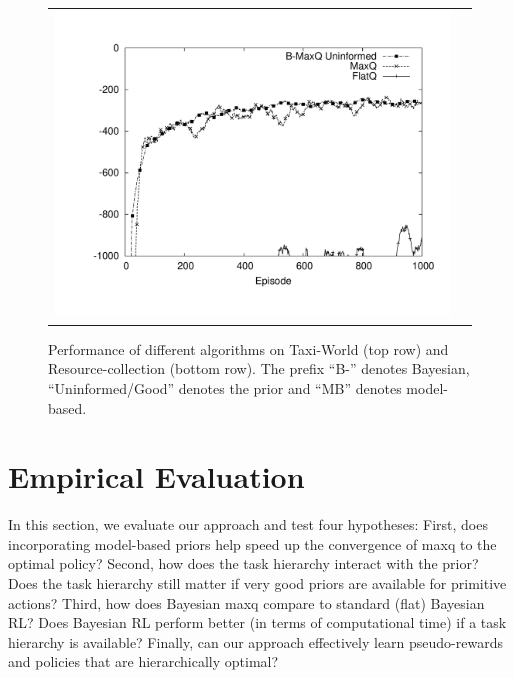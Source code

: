 \begin{figure}[ht]
\begin{tabular}{cc}
\includegraphics[trim=50 50 30 50, clip, scale=0.3]{exp/Wargus3322nb.pdf} \\
\end{tabular}

\caption{Performance of different algorithms on {\sf Taxi-World} (top row) and {\sf Resource-collection} (bottom row). The
prefix ``B-'' denotes Bayesian, ``Uninformed/Good'' denotes the
prior and ``MB'' denotes model-based.}\label{fig:nopr}
\vspace{-0.2in}
\end{figure}

\section{Empirical Evaluation}
\label{sec:expts}

In this section, we evaluate our approach and test four hypotheses:
First, does incorporating model-based priors help speed up the
convergence of {\sc maxq} to the optimal policy? Second, how does the
task hierarchy interact with the prior? Does the task hierarchy still
matter if very good priors are available for primitive actions? Third,
how does Bayesian {\sc maxq} compare to standard (flat) Bayesian RL? Does
Bayesian RL perform better (in terms of computational time) if a task
hierarchy is available? Finally, can our approach effectively learn
pseudo-rewards and policies that are hierarchically optimal?

